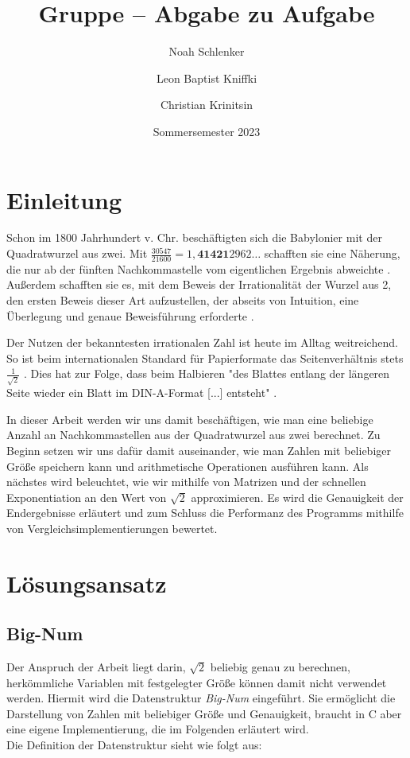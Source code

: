 \documentclass[course=erap]{aspdoc}
\author{Noah Schlenker \and Leon Baptist Kniffki \and Christian Krinitsin}
\date{Sommersemester 2023} %
\title{Gruppe \theGroup{} -- Abgabe zu Aufgabe \theNumber}
\begin{document}
\maketitle

\section{Einleitung} \label{sec:einleitung}
Schon im 1800 Jahrhundert v. Chr. beschäftigten sich die Babylonier mit der Quadratwurzel aus zwei. Mit $\tfrac {30547}{21600} = 1,\textbf{41421}2962\dots$ schafften sie eine Näherung, die nur
ab der fünften Nachkommastelle vom eigentlichen Ergebnis abweichte \cite{quadratwurzel_aus_2}. Außerdem schafften sie es, mit dem Beweis der Irrationalität der Wurzel aus 2, den ersten Beweis 
dieser Art aufzustellen, der abseits von Intuition, eine Überlegung und genaue Beweisführung erforderte \cite{lemonde_wurzel_2}. \par

Der Nutzen der bekanntesten irrationalen Zahl ist heute im Alltag weitreichend. So ist beim internationalen Standard für Papierformate das Seitenverhältnis stets $\frac{1}{\sqrt{2}}$ \cite{papierformat}. 
Dies hat zur Folge, dass beim Halbieren "des Blattes entlang der längeren Seite wieder ein Blatt im DIN-A-Format [...] entsteht" \cite{quadratwurzel_aus_2}. \par

In dieser Arbeit werden wir uns damit beschäftigen, wie man eine beliebige Anzahl an Nachkommastellen aus der Quadratwurzel aus zwei berechnet. Zu Beginn setzen wir uns dafür damit auseinander, 
wie man Zahlen mit beliebiger Größe speichern kann und arithmetische Operationen ausführen kann. Als nächstes wird beleuchtet, wie wir mithilfe von Matrizen und der schnellen Exponentiation
an den Wert von $\sqrt{2}$ approximieren. Es wird die Genauigkeit der Endergebnisse erläutert und zum Schluss die Performanz des Programms mithilfe von Vergleichsimplementierungen bewertet.

\section{Lösungsansatz} \label{sec:loesungsansatz}
\subsection{Big-Num} \label{sec:bignum}
Der Anspruch der Arbeit liegt darin, $\sqrt{2}$ beliebig genau zu berechnen, herkömmliche Variablen mit festgelegter Größe können damit nicht verwendet werden. Hiermit wird die Datenstruktur \textit{Big-Num} eingeführt.
Sie ermöglicht die Darstellung von Zahlen mit beliebiger Größe und Genauigkeit, braucht in C aber eine eigene Implementierung, die im Folgenden erläutert wird. \\
Die Definition der Datenstruktur sieht wie folgt aus:
\end{document}
